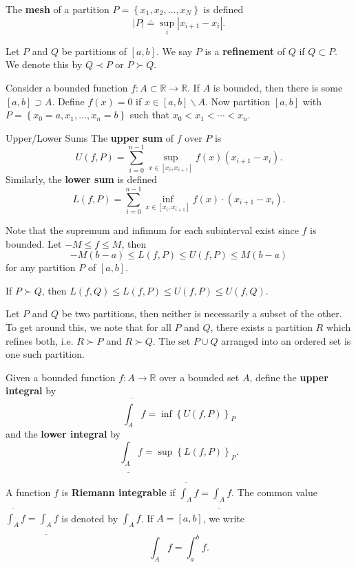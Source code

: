 \documentclass[twoside,10pt]{report}
\begin{document}
\begin{defn}[]
The \textbf{mesh} of a partition $P =\left\{ x_1,x_2,\dots,x_N \right\}$ is defined
\[
	|P| \doteq \sup_i |x_{i+1}-x_i|.
\] 
\end{defn}

\begin{defn}[]
	Let $P$ and $Q$ be partitions of $[a,b]$. We say $P$ is a \textbf{refinement} of $Q$ if $Q \subset P$. We denote this by $Q \prec P$ or $P \succ Q$.
\end{defn}

Consider a bounded function $f:A \subset \mathbb{R}\to\mathbb{R}$. If $A$ is bounded, then there is some $[a,b]\supset A$. Define $f(x)=0$ if $x \in [a,b]\backslash A$. Now partition $[a,b]$ with $P=\left\{ x_0=a,x_1,\dots,x_n=b \right\}$ such that $x_0<x_1<\cdots<x_n$.

\begin{defn}{Upper/Lower Sums}{}
	The \textbf{upper sum} of $f$ over $P$ is
	\[
		U(f,P) = \sum_{i=0}^{n-1} \sup_{x\in[x_i,x_{i+1}]} f(x) (x_{i+1}-x_i).
	\] 
	Similarly, the \textbf{lower sum} is defined
	\[
		L(f,P) = \sum_{i=0}^{n-1} \inf_{x\in[x_i,x_{i+1}]} f(x) \cdot (x_{i+1}-x_i).
	\] 
\end{defn}

Note that the supremum and infimum for each subinterval exist since $f$ is bounded. Let $-M \leq f \leq M$, then
\[
	-M(b-a) \leq L(f,P) \leq U(f,P) \leq M(b-a)
\] for any partition $P$ of $[a,b]$.

\begin{prop}
	If $P \succ Q$, then $L(f,Q) \leq L(f,P) \leq U(f,P) \leq U(f,Q)$.
\end{prop}

Let $P$ and $Q$ be two partitions, then neither is necessarily a subset of the other. To get around this, we note that for all $P$ and $Q$, there exists a partition $R$ which refines both, i.e. $R \succ P$ and $R \succ Q$. The set $P \cup Q$ arranged into an ordered set is one such partition.

\newpage
\begin{defn}[]
Given a bounded function $f:A \to \mathbb{R}$ over a bounded set $A$, define the \textbf{upper integral} by
\[
	\overline{\int_{A} } f = \inf\left\{ U(f,P) \right\}_P
\] 
and the \textbf{lower integral} by
\[
	\underline{\int_{A} } f = \sup \left\{ L(f,P) \right\}_P.
\] 
\end{defn}

\begin{defn}[]
	A function $f$ is \textbf{Riemann integrable} if $\overline{\int_{A} } f = \underline{\int_{A} } f$. The common value $\overline{\int_{A} } f = \underline{\int_{A} } f$ is denoted by $\int_{A} f$. If $A=[a,b]$, we write
	\[ 
	\int_{A} f = \int_{a}^{b} f.
	\] 
\end{defn}
\end{document}
